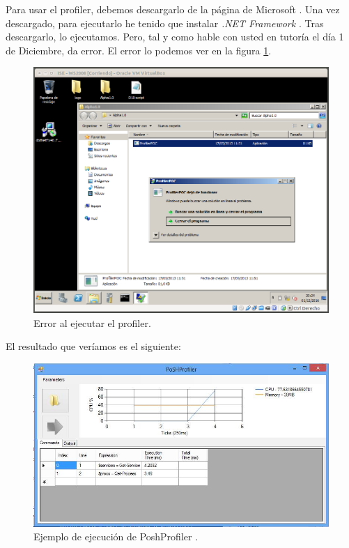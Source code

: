 \documentclass[a4paper,titlepage,12pt]{report}	%
\numberwithin{figure}{section} %
\numberwithin{table}{section} %
\begin{document}
	Para usar el profiler, debemos descargarlo de la página de Microsoft \cite{profiler_powershell}. Una vez descargado, para ejecutarlo he tenido que instalar \textit{.NET Framework} \cite{net_framework}. Tras descargarlo, lo ejecutamos. Pero, tal y como hable con usted en tutoría el día 1 de Diciembre, da error. El error lo podemos ver en la figura \ref{P3-O10-error}.
	\begin{figure}[H]
	   \centering
	   \includegraphics[scale=0.43]{./Imagenes/P3/O10-error.png}
	   \caption[Error al ejecutar el profiler.]{Error al ejecutar el profiler.}
	   \label{P3-O10-error}
	\end{figure}

	El resultado que veríamos es el siguiente:

	\begin{figure}[H]
	   \centering
	   \includegraphics[scale=0.6]{./Imagenes/P3/O10-profiler.png}
	   \caption[Ejemplo de ejecución de PoshProfiler \cite{poshprofiler}.]{Ejemplo de ejecución de PoshProfiler \cite{poshprofiler}.}
	   \label{P3-O10-profiler}
	\end{figure}
\end{document}
